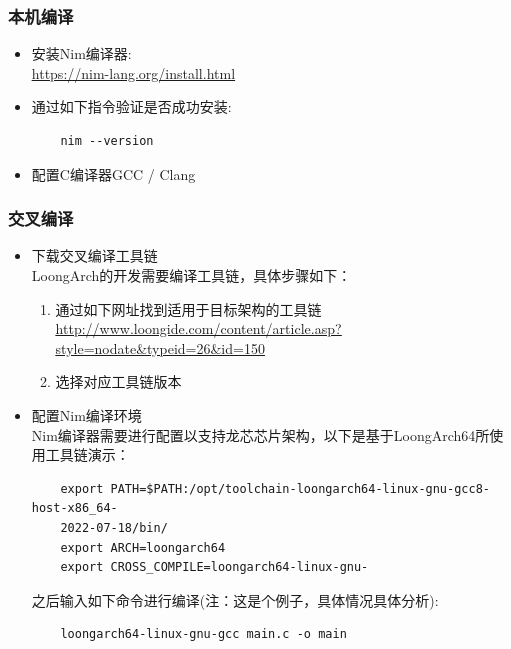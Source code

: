 \documentclass[UTF8]{ctexart}
\begin{document}
	\subsubsection{本机编译} %
	\begin{itemize}[leftmargin=3.5em]
		\item 安装Nim编译器: \\
		\underline{\url{https://nim-lang.org/install.html}}
		\item 通过如下指令验证是否成功安装: 
		\begin{tcolorbox}[colback=gray!20, colframe=gray!20, rounded corners, boxrule=-5pt, height=0.01\textheight, width=0.18\textwidth, left=0pt, right=0pt, top=0pt, bottom=0pt]
			\begin{verbatim}
	nim --version
			\end{verbatim}
		\end{tcolorbox}
		\item 配置C编译器GCC / Clang
	\end{itemize}
	\subsubsection{交叉编译} %
	\begin{itemize}[leftmargin=3.5em]
		\item 下载交叉编译工具链 \\
		LoongArch的开发需要编译工具链，具体步骤如下：
		\begin{enumerate}[leftmargin=1em]
				\item 通过如下网址找到适用于目标架构的工具链 \\
				\underline{\url{http://www.loongide.com/content/article.asp?style=nodate&typeid=26&id=150}}
				\item 选择对应工具链版本
		\end{enumerate}
		\item 配置Nim编译环境 \\
		Nim编译器需要进行配置以支持龙芯芯片架构，以下是基于LoongArch64所使用工具链演示：
		\begin{tcolorbox}[colback=gray!20, colframe=gray!20, rounded corners, boxrule=-5pt, height=0.08\textheight, width=0.9\textwidth, left=0pt, right=0pt, top=0pt, bottom=0pt]
			\begin{verbatim}
	export PATH=$PATH:/opt/toolchain-loongarch64-linux-gnu-gcc8-host-x86_64-
	2022-07-18/bin/
	export ARCH=loongarch64
	export CROSS_COMPILE=loongarch64-linux-gnu-
			\end{verbatim}
		\end{tcolorbox}
		之后输入如下命令进行编译(注：这是个例子，具体情况具体分析):
		\begin{tcolorbox}[colback=gray!20, colframe=gray!20, rounded corners, boxrule=-5pt, height=0.01\textheight, width=0.53\textwidth, left=0pt, right=0pt, top=0pt, bottom=0pt]
			\begin{verbatim}
	loongarch64-linux-gnu-gcc main.c -o main
			\end{verbatim}
		\end{tcolorbox}
	\end{itemize}
\end{document}
